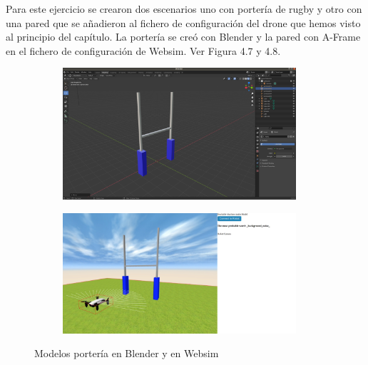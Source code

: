 Para este ejercicio se crearon dos escenarios uno con portería de rugby y otro con una pared que se añadieron al  fichero de configuración del drone que hemos visto al principio del capítulo. La portería se creó con Blender y la pared con A-Frame en el fichero de configuración de Websim. Ver Figura 4.7 y 4.8.

 \begin{figure}[H]
  \begin{subfigure}[b]{0.5\textwidth}
  \centering
    \includegraphics[width=0.95\textwidth, height=0.7\textwidth]{chapters/images/porteriablender.png}
    \caption{}
    \label{fig:f1}
  \end{subfigure}
  \hfill
  \begin{subfigure}[b]{0.5\textwidth}
  \centering
    \includegraphics[width=0.95\textwidth, height=0.7\textwidth]{chapters/images/porteriawebsim.png}
	\caption{}    
    \label{fig:f2}
 
  \end{subfigure}
  \caption{Modelos portería en Blender y  en Websim }
\end{figure}


